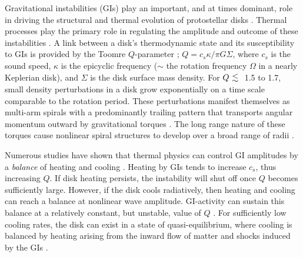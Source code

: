 \documentclass[manuscript]{aastex} %
\newcommand{\al}{\mbox{ \raisebox{-.8ex}{$\stackrel{\textstyle <}{\sim}$} }}
\begin{document}
Gravitational instabilities (GIs) play an important, and at times dominant, role in driving the structural and thermal
evolution of  protostellar disks \citep[for a review, see][]{durisen2005}.
Thermal processes play the primary role in regulating the amplitude and outcome of these instabilities \citep{pickett1998,pickett2000,mejia2005,nelson1998,nelson2000a}. A link between a disk's thermodynamic state and its susceptibility to GIs is provided by the Toomre $Q$-parameter \citep{toomre1981};  $Q = c_s \kappa / \pi G \Sigma$, where $c_s$ is the sound speed, $\kappa$ is the epicyclic frequency ($\sim$ the rotation frequency 
$\Omega$ in a nearly Keplerian disk), and $\Sigma$ is the disk surface mass density. For $Q \al$  1.5 to 1.7,  small density perturbations in a disk grow exponentially on a time scale comparable to the rotation period. These perturbations manifest themselves as multi-arm spirals with a predominantly trailing pattern that transports angular momentum outward by gravitational torques \citep[e.g.]{larson1984,boss1984,durisen1986,papaloizou1991, laughlin1994,nelson1998,pickett1998}. The long range nature of these torques cause nonlinear
spiral structures to develop over a broad range of radii \citep{laughlin1998,nelson1998,nelson2000a,pickett1998, pickett2000,pickett2003}.

Numerous studies have shown that thermal physics can control GI amplitudes by a {\it balance} of heating and cooling \citep[for example]{tomley1991,tomley1994,pickett1998,pickett2000, pickett2003,gammie2001,boss2002,rice2003b,mejia2005,boley2006,boley2007, stamatellos2008,cossins2009}.
Heating by GIs tends to increase $c_s$, thus increasing $Q$. If disk heating persists, the instability will shut off once $Q$ becomes sufficiently large.  However, if the disk cools radiatively, then heating and cooling can reach a balance at nonlinear wave amplitude. GI-activity can sustain this balance  at a relatively constant,
but unstable, value of $Q$ \citep{paczynski1978, lin1981,goldreich1965}.  
For sufficiently low cooling rates, the disk can exist in a state of quasi-equilibrium, where cooling is 
balanced by heating arising from the inward flow of matter and shocks induced by the GIs
\citep{gammie2001, lodato2004, rice2005, cossins2009, vorobyov2010}.
\end{document}
